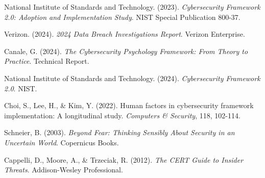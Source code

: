 \documentclass[10pt, twocolumn]{article}
\begin{document}
\begin{thebibliography}{99}

National Institute of Standards and Technology. (2023). \textit{Cybersecurity Framework 2.0: Adoption and Implementation Study}. NIST Special Publication 800-37.

Verizon. (2024). \textit{2024 Data Breach Investigations Report}. Verizon Enterprise.

Canale, G. (2024). \textit{The Cybersecurity Psychology Framework: From Theory to Practice}. Technical Report.

National Institute of Standards and Technology. (2024). \textit{Cybersecurity Framework 2.0}. NIST.

Choi, S., Lee, H., \& Kim, Y. (2022). Human factors in cybersecurity framework implementation: A longitudinal study. \textit{Computers \& Security}, 118, 102-114.

Schneier, B. (2003). \textit{Beyond Fear: Thinking Sensibly About Security in an Uncertain World}. Copernicus Books.

Cappelli, D., Moore, A., \& Trzeciak, R. (2012). \textit{The CERT Guide to Insider Threats}. Addison-Wesley Professional.

\end{thebibliography}
\end{document}
